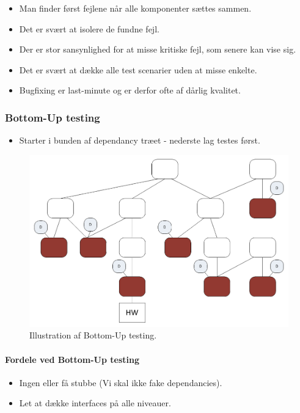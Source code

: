 \begin{itemize}
	\item Man finder først fejlene når alle komponenter sættes sammen.
	\item Det er svært at isolere de fundne fejl.
	\item Der er stor sansynlighed for at misse kritiske fejl, som senere kan vise sig. 
	\item Det er svært at dække alle test scenarier uden at misse enkelte.
	\item Bugfixing er last-minute og er derfor ofte af dårlig kvalitet.
\end{itemize}


\subsubsection{Bottom-Up testing}

\begin{itemize}
	\item Starter i bunden af dependancy træet - nederste lag testes først.
\end{itemize}

\begin{figure}
\centering
\includegraphics[width=0.7\linewidth]{figs/bottomUp.PNG}
\caption{Illustration af Bottom-Up testing.}
\label{fig:bottomUp}
\end{figure}

\paragraph{Fordele ved Bottom-Up testing}

\begin{itemize}
	\item Ingen eller få stubbe (Vi skal ikke fake dependancies).
	\item Let at dække interfaces på alle niveauer.
\end{itemize}

